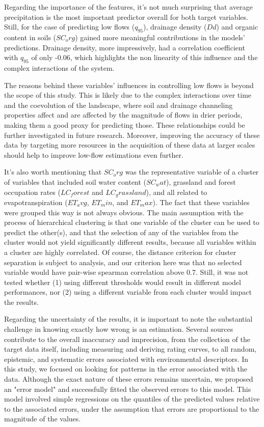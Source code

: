 \documentclass[12pt]{article}
\begin{document}
\par Regarding the importance of the features, it’s not much surprising that average precipitation is the most important predictor overall for both target variables. Still, for the case of predicting low flows ($q_{95}$), drainage density ($Dd$) and organic content in soils ($SC_org$) gained more meaningful contributions in the models' predictions. Drainage density, more impressively, had a correlation coefficient with $q_95$ of only -0.06, which highlights the non linearity of this influence and the complex interactions of the system.

\par The reasons behind these variables' influences in controlling low flows is beyond the scope of this study. This is likely due to the complex interactions over time and the coevolution of the landscape, where soil and drainage channeling properties affect and are affected by the magnitude of flows in drier periods, making them a good proxy for predicting those. These relationships could be further investigated in future research. Moreover, improving the accuracy of these data by targeting more resources in the acquisition of these data at larger scales should help to improve low-flow estimations even further.

\par It's also worth mentioning that $SC_org$ was the representative variable of a cluster of variables that included soil water content ($SC_wat$), grassland and forest occupation rates ($LC_forest$ and $LC_grassland$), and all related to evapotranspiration ($ET_avg$, $ET_min$, and $ET_max$). The fact that these variables were grouped this way is not always obvious. The main assumption with the process of hierarchical clustering is that one variable of the cluster can be used to predict the other(s), and that the selection of any of the variables from the cluster would not yield significantly different results, because all variables within a cluster are highly correlated. Of course, the distance criterion for cluster separation is subject to analysis, and our criterion here was that no selected variable would have pair-wise spearman correlation above 0.7. Still, it was not tested whether (1) using different thresholds would result in different model performances, nor (2) using a different variable from each cluster would impact the results.

\par Regarding the uncertainty of the results, it is important to note the substantial challenge in knowing exactly how wrong is an estimation. Several sources contribute to the overall inaccuracy and imprecision, from the collection of the target data itself, including measuring and deriving rating curves, to all random, epistemic, and systematic errors associated with environmental descriptors. In this study, we focused on looking for patterns in the error associated with the data. Although the exact nature of these errors remains uncertain, we proposed an "error model" and successfully fitted the observed errors to this model. This model involved simple regressions on the quantiles of the predicted values relative to the associated errors, under the assumption that errors are proportional to the magnitude of the values.
\end{document}
